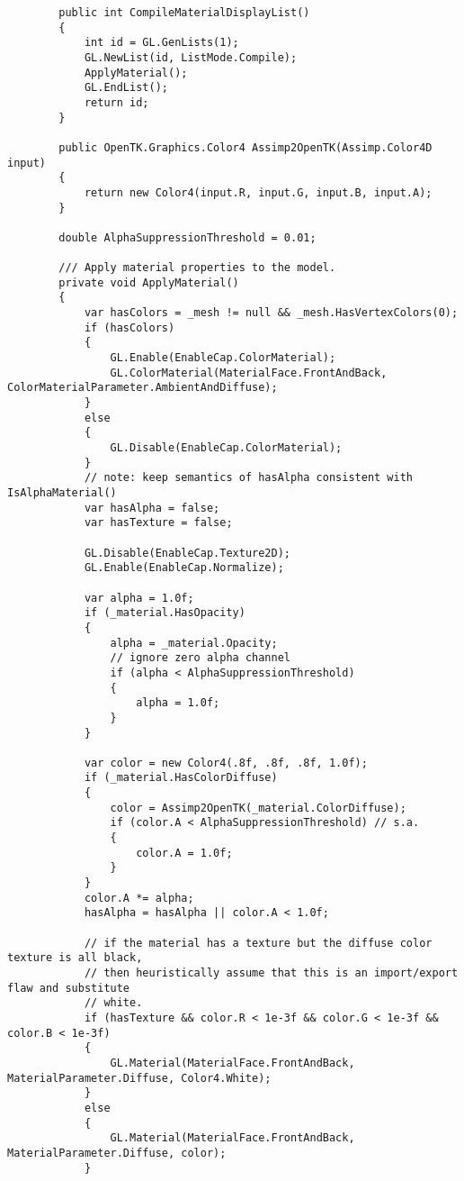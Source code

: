 \begin{scriptsize}
\begin{verbatim}
        public int CompileMaterialDisplayList()
        {
            int id = GL.GenLists(1);
            GL.NewList(id, ListMode.Compile);
            ApplyMaterial();
            GL.EndList();
            return id;
        }

        public OpenTK.Graphics.Color4 Assimp2OpenTK(Assimp.Color4D input)
        {
            return new Color4(input.R, input.G, input.B, input.A);
        }

        double AlphaSuppressionThreshold = 0.01;

        /// Apply material properties to the model.
        private void ApplyMaterial()
        {
            var hasColors = _mesh != null && _mesh.HasVertexColors(0);
            if (hasColors)
            {
                GL.Enable(EnableCap.ColorMaterial);
                GL.ColorMaterial(MaterialFace.FrontAndBack, ColorMaterialParameter.AmbientAndDiffuse);
            }
            else
            {
                GL.Disable(EnableCap.ColorMaterial);
            }
            // note: keep semantics of hasAlpha consistent with IsAlphaMaterial()
            var hasAlpha = false;
            var hasTexture = false;

            GL.Disable(EnableCap.Texture2D);
            GL.Enable(EnableCap.Normalize);

            var alpha = 1.0f;
            if (_material.HasOpacity)
            {
                alpha = _material.Opacity;
                // ignore zero alpha channel
                if (alpha < AlphaSuppressionThreshold) 
                {
                    alpha = 1.0f;
                }
            }

            var color = new Color4(.8f, .8f, .8f, 1.0f);
            if (_material.HasColorDiffuse)
            {
                color = Assimp2OpenTK(_material.ColorDiffuse);
                if (color.A < AlphaSuppressionThreshold) // s.a.
                {
                    color.A = 1.0f;
                }
            }
            color.A *= alpha;
            hasAlpha = hasAlpha || color.A < 1.0f;

            // if the material has a texture but the diffuse color texture is all black,
            // then heuristically assume that this is an import/export flaw and substitute
            // white.
            if (hasTexture && color.R < 1e-3f && color.G < 1e-3f && color.B < 1e-3f)
            {
                GL.Material(MaterialFace.FrontAndBack, MaterialParameter.Diffuse, Color4.White);
            }
            else
            {
                GL.Material(MaterialFace.FrontAndBack, MaterialParameter.Diffuse, color);
            }


\end{verbatim}
\end{scriptsize}
